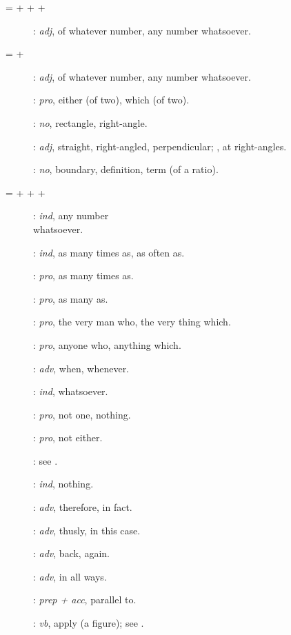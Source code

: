{\begin{description}
\item[ =  +  +  + ]: {\em adj},
of whatever number, any number whatsoever.
\item[ =  + ]: {\em adj},
of whatever number, any number whatsoever.
\item[]: {\em pro}, either (of two), which (of two).
\item[]: {\em no}, rectangle, right-angle.
\item[]: {\em adj}, straight, right-angled, perpendicular; , at right-angles.
\item[]: {\em no}, boundary, definition, term (of a ratio).
\item[ =  +  +  + ]: {\em ind}, any number\\ whatsoever.
\item[]: {\em ind}, as many times as, as often as.
\item[]: {\em pro}, as many times as.
\item[]: {\em pro}, as many as.
\item[]: {\em pro}, the very man who, the very thing which.
\item[]: {\em pro}, anyone who, anything which.
\item[]:  {\em adv}, when, whenever.
\item[]: {\em ind}, whatsoever.
\item[]: {\em pro}, not one, nothing. 
\item[]: {\em pro}, not either.
\item[]: see .
\item[]: {\em ind}, nothing.
\item[]: {\em adv}, therefore, in fact.
\item[]: {\em adv}, thusly, in this case.
\item[]: {\em adv}, back, again.
\item[]: {\em adv}, in all ways.
\item[]: {\em prep + acc}, parallel to.
\item[]: {\em vb}, apply (a figure); see .

\end{description}}

